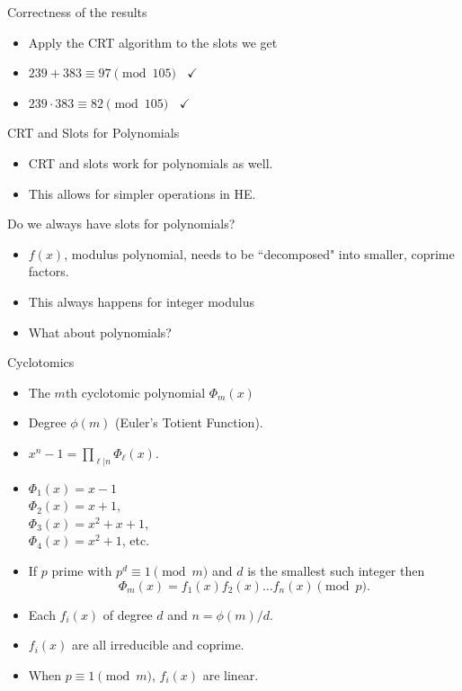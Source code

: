 \documentclass[ %
usenames,dvipsnames,
aspectratio=169,11pt]{beamer}
\newenvironment{stepitemize}{\begin{itemize}[<+->]}{\end{itemize} }
\begin{document}
\begin{frame}{Correctness of the results}
\begin{stepitemize}
    \item Apply the CRT algorithm to the slots we get
    \item $239+383 \equiv 97 \pmod{105} \:\:\:\: \checkmark$
    \item $239\cdot 383 \equiv 82\pmod{105} \:\:\:\: \checkmark$
\end{stepitemize}

\end{frame}
\begin{frame}{CRT and Slots for Polynomials}
\begin{stepitemize}
    \item CRT and slots work for polynomials as well.
    \item This allows for simpler operations in HE.
\end{stepitemize}
\end{frame}

\begin{frame}{Do we always have slots for polynomials?}
    \begin{stepitemize}
    \item $f(x)$, modulus polynomial, needs to be ``decomposed" into smaller, coprime factors.
    \item This always happens for integer modulus
    \item What about polynomials?
    \end{stepitemize}
\end{frame}

\begin{frame}{Cyclotomics}
    \begin{stepitemize}
    \item The $m$th cyclotomic polynomial $\Phi_m(x)$
    \item Degree $\phi(m)$ (Euler's Totient Function).
    \item $x^n-1 = \prod_{\ell|n}\Phi_{\ell}(x)$.
    \item $\Phi_1(x)=x-1$
    \\ $\Phi_2(x)=x+1$,
    \\ $\Phi_3(x)=x^2+x+1$, \\
    $\Phi_4(x)= x^2+1$, etc.
    \item If $p$ prime with $p^d\equiv 1\pmod{m}$ and $d$ is the smallest such integer then
    $$\Phi_m(x) = f_1(x)f_2(x) \dots f_n(x) \pmod{p}.$$
    \item Each $f_i(x)$ of degree $d$ and $n=\phi(m)/d$.
    \item $f_i(x)$ are all irreducible and coprime.
    \item When $p\equiv 1\pmod{m}$, $f_i(x)$ are linear.
    \end{stepitemize}
\end{frame}
\end{document}
